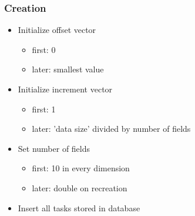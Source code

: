 \begin{frame}
	\frametitle{Creation}
		\begin{itemize}
			\pause
			\item{Initialize offset vector}
			\begin{itemize}
				\pause
				\item{first: 0}
				\pause
				\item{later: smallest value}
			\end{itemize}
			\pause
			\item{Initialize increment vector}
			\begin{itemize}
				\pause
				\item{first: 1}
				\pause
				\item{later: 'data size' divided by number of fields}
			\end{itemize}
			\pause
			\item{Set number of fields}			
			\begin{itemize}
				\pause
				\item{first: 10 in every dimension}
				\pause
				\item{later: double on recreation}
			\end{itemize}
			\pause
			\item{Insert all tasks stored in database}			
		\end{itemize}
\end{frame}

